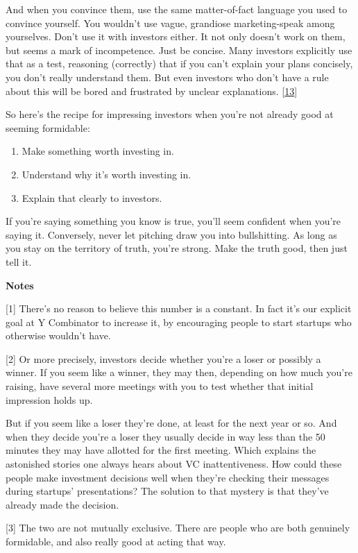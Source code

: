 And when you convince them, use the same matter-of-fact language you
used to convince yourself. You wouldn't use vague, grandiose
marketing-speak among yourselves. Don't use it with investors either. It
not only doesn't work on them, but seems a mark of incompetence. Just be
concise. Many investors explicitly use that as a test, reasoning
(correctly) that if you can't explain your plans concisely, you don't
really understand them. But even investors who don't have a rule about
this will be bored and frustrated by unclear explanations.
{[}\hyperref[f13n]{13}{]}

So here's the recipe for impressing investors when you're not already
good at seeming formidable:

\begin{enumerate}
\def\labelenumi{\arabic{enumi}.}
\item
  Make something worth investing in.
\item
  Understand why it's worth investing in.
\item
  Explain that clearly to investors.
\end{enumerate}

If you're saying something you know is true, you'll seem confident when
you're saying it. Conversely, never let pitching draw you into
bullshitting. As long as you stay on the territory of truth, you're
strong. Make the truth good, then just tell it.

\textbf{Notes}

{[}1{]} There's no reason to believe this number is a constant. In fact
it's our explicit goal at Y Combinator to increase it, by encouraging
people to start startups who otherwise wouldn't have.

{[}2{]} Or more precisely, investors decide whether you're a loser or
possibly a winner. If you seem like a winner, they may then, depending
on how much you're raising, have several more meetings with you to test
whether that initial impression holds up.

But if you seem like a loser they're done, at least for the next year or
so. And when they decide you're a loser they usually decide in way less
than the 50 minutes they may have allotted for the first meeting. Which
explains the astonished stories one always hears about VC
inattentiveness. How could these people make investment decisions well
when they're checking their messages during startups' presentations? The
solution to that mystery is that they've already made the decision.

{[}3{]} The two are not mutually exclusive. There are people who are
both genuinely formidable, and also really good at acting that way.

